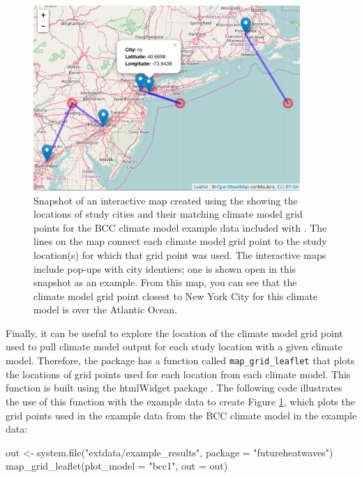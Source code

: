 \begin{figure}
\begin{center}
\includegraphics[width = 0.9\textwidth]{ExampleLeaflet}
\end{center}
\caption{Snapshot of an interactive map created using the  showing the locations of study cities and their matching climate model grid points for the BCC climate model example data included with . The lines on the map connect each climate model grid point to the study location(s) for which that grid point was used. The interactive maps include pop-ups with city identiers; one is shown open in this snapshot as an example. From this map, you can see that the climate model grid point closest to New York City for this climate model is over the Atlantic Ocean.}
\label{fig:gridmap}
\end{figure}

Finally, it can be useful to explore the location of the climate model
grid point used to pull climate model output for each study location
with a given climate model. Therefore, the package has a function called
\texttt{map\_grid\_leaflet} that plots the locations of grid points used
for each location from each climate model. This function is built using
the htmlWidget  package \citep{leaflet}. The following
code illustrates the use of this function with the example data to
create Figure \ref{fig:gridmap}, which plots the grid points used in the
example data from the BCC climate model in the example data:

\begin{Schunk}
\begin{Sinput}
out <- system.file("extdata/example_results", package = "futureheatwaves")
map_grid_leaflet(plot_model = "bcc1", out = out)
\end{Sinput}
\end{Schunk}

